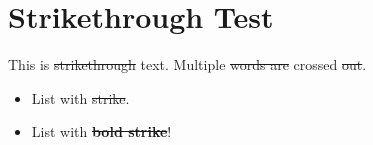 \section{Strikethrough Test}

This is \sout{strikethrough} text.
Multiple \sout{words are} crossed \sout{out}.

\begin{itemize}
    \item List with \sout{strike}.
    \item List with \textbf{\sout{bold strike}}!
\end{itemize}
